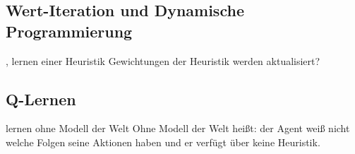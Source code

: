 \subsection{Wert-Iteration und Dynamische Programmierung}
\label{subsec:Wert-Iteration und Dynamische Programmierung}
, lernen einer Heuristik
Gewichtungen der Heuristik werden aktualisiert?

\subsection{Q-Lernen}
\label{subsec:Q-Lernen}
 lernen ohne Modell der Welt
Ohne Modell der Welt heißt: der Agent weiß nicht welche Folgen seine Aktionen haben und er verfügt über keine Heuristik.